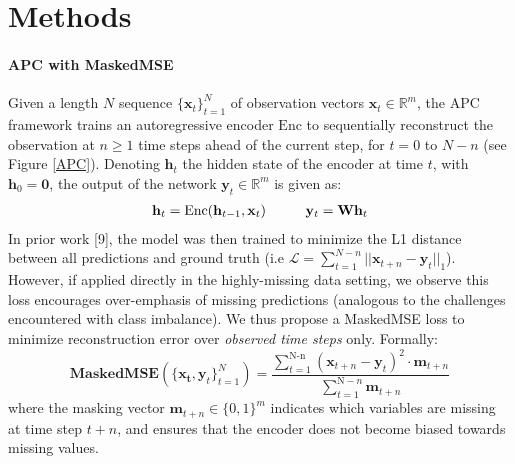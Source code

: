 \documentclass{article}
\begin{document}
\section{Methods}
\paragraph{APC with MaskedMSE}



Given a length $N$ sequence $\{\mathbf{x}_t\}_{t=1}^N$ of observation vectors $\mathbf{x}_t \in \mathbb{R}^m$, the APC framework trains an autoregressive encoder $\mathrm{Enc}$ to sequentially reconstruct the observation at $n \geq 1$ time steps ahead of the current step, for $t=0$ to $N-n$ (see Figure \ref{APC}). Denoting $\mathbf{h}_{t}$ the hidden state of the encoder at time $t$, with $\mathbf{h}_0 = \mathbf{0}$, the output of the network $\mathbf{y}_t \in \mathbb{R}^{m}$ is given as:
\begin{equation}
\begin{array}{l}
\mathbf{h}_t = \mathrm{Enc}(\mathbf{h}_{t-1}, \mathbf{x}_t) \hspace{10mm}
\mathbf{y}_t = \mathbf{W}\mathbf{h}_t
\end{array}
\end{equation} 
In prior work [9],
the model was then trained to minimize the L1 distance between all predictions and ground truth (i.e $\mathcal{L} = \sum_{t=1}^{N-n}||\mathbf{x}_{t+n} - \mathbf{y}_t||_1$). However, if applied directly in the highly-missing data setting, we observe this loss encourages over-emphasis of missing predictions (analogous to the challenges encountered with class imbalance).
We thus propose a MaskedMSE loss to minimize reconstruction error over \emph{observed time steps} only. Formally:
\begin{equation}
\textbf{MaskedMSE}(\{\mathbf{x_t}, \mathbf{y}_t\}_{t=1}^N) = \frac{\sum^{\text{N-n}}_{t=1}(\mathbf{x}_{t+n} - \mathbf{y}_{t})^{2} \cdot \mathbf{m}_{t+n}}{\sum^{\text{N}-n}_{t=1}\mathbf{m}_{t+n}}
\end{equation} 
\noindent where
the masking vector $\mathbf{m}_{t+n} \in\{0,1\}^{m}$ indicates which variables are missing at time step $t+n$, and ensures that the encoder does not become biased towards missing values. 
\end{document}
